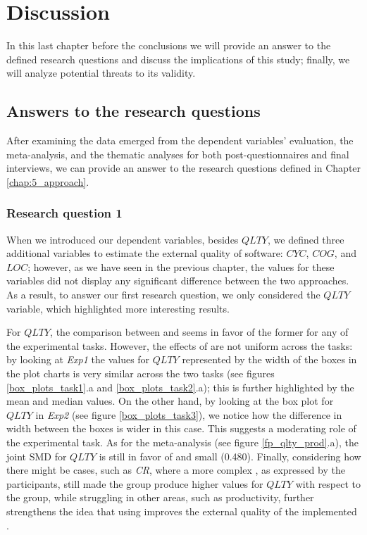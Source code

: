 \chapter{Discussion}
\label{chap:6_discussion}
In this last chapter before the conclusions we will provide an answer to the defined research questions and discuss the implications of this study; finally, we will analyze potential threats to its validity.

\section{Answers to the research questions}
After examining the data emerged from the dependent variables' evaluation, the meta-analysis, and the thematic analyses for both post-questionnaires and final interviews, we can provide an answer to the research questions defined in Chapter \ref{chap:5_approach}.



\subsection{Research question 1}
When we introduced our dependent variables, besides $QLTY$, we defined three additional variables to estimate the external quality of software: $CYC$, $COG$, and $LOC$; however, as we have seen in the previous chapter, the values for these variables did not display any significant difference between the two approaches. As a result, to answer our first research question, we only considered the $QLTY$ variable, which highlighted more interesting results.

For $QLTY$, the comparison between \tdd and \notdd seems in favor of the former for any of the experimental tasks. However, the effects of \tdd are not uniform across the tasks: by looking at \textit{Exp1} the values for $QLTY$ represented by the width of the boxes in the plot charts is very similar across the two tasks (see figures \ref{box_plots_task1}.a and \ref{box_plots_task2}.a); this is further highlighted by the mean and median values. 
On the other hand, by looking at the box plot for $QLTY$ in \textit{Exp2} (see figure \ref{box_plots_task3}), we notice how the difference in width between the boxes is wider in this case. This suggests a moderating role of the experimental task.
As for the meta-analysis (see figure \ref{fp_qlty_prod}.a), the joint SMD for $QLTY$ is still in favor of \tdd and small (0.480).
Finally, considering how there might be cases, such as \textit{CR}, where a more complex \es, as expressed by the participants, still made the \tdd group produce higher values for $QLTY$ with respect to the \notdd group, while struggling in other areas, such as productivity, further strengthens the idea that using \tdd improves the external quality of the implemented \es.




